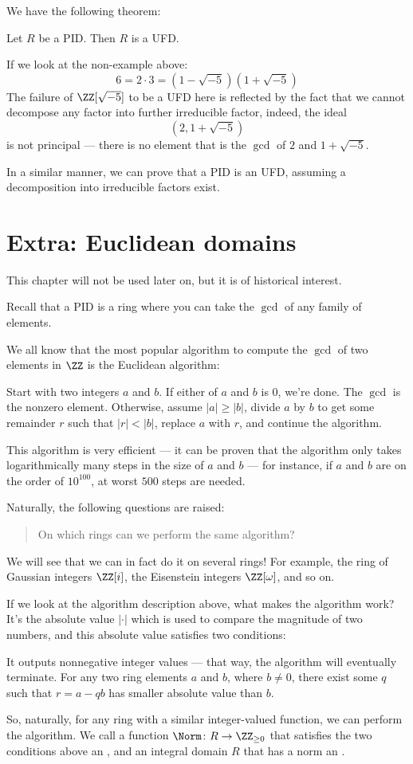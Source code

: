 We have the following theorem:
\begin{theorem}
	Let $R$ be a PID. Then $R$ is a UFD.
\end{theorem}

If we look at the non-example above:
\[ 6 = 2 \cdot 3 = \left( 1-\sqrt{-5} \right) \left( 1+\sqrt{-5} \right) \]
The failure of $\ZZ[\sqrt{-5}]$ to be a UFD here is reflected by the fact that we cannot decompose
any factor into further irreducible factor, indeed, the ideal
\[ \left( 2, 1 + \sqrt{-5} \right) \]
is not principal --- there is no element that is the $\gcd$ of $2$ and $1 + \sqrt{-5}$.

In a similar manner, we can prove that a PID is an UFD, assuming a decomposition into irreducible
factors exist.

\section{Extra: Euclidean domains}

This chapter will not be used later on, but it is of historical interest.

Recall that a PID is a ring where you can take the $\gcd$ of any family of elements.

We all know that the most popular algorithm to compute the $\gcd$ of two elements in $\ZZ$ is the
Euclidean algorithm:
\begin{itemize}
	\ii Start with two integers $a$ and $b$.
	\ii If either of $a$ and $b$ is $0$, we're done. The $\gcd$ is the nonzero element.
	\ii Otherwise, assume $|a| \geq |b|$, divide $a$ by $b$ to get some remainder $r$ such that
	$|r| < |b|$, replace $a$ with $r$, and continue the algorithm.
\end{itemize}
This algorithm is very efficient --- it can be proven that the algorithm only takes logarithmically
many steps in the size of $a$ and $b$ --- for instance, if $a$ and $b$ are on the order of
$10^{100}$, at worst $500$ steps are needed.

Naturally, the following questions are raised:
\begin{quote}
	On which rings can we perform the same algorithm?
\end{quote}
We will see that we can in fact do it on several rings! For example, the ring of Gaussian integers
$\ZZ[i]$, the Eisenstein integers $\ZZ[\omega]$, and so on.

If we look at the algorithm description above, what makes the algorithm work?
It's the absolute value $|\cdot|$ which is used to compare the magnitude of two numbers,
and this absolute value satisfies two conditions:
\begin{itemize}
	\ii It outputs nonnegative integer values --- that way, the algorithm will eventually terminate.
	\ii For any two ring elements $a$ and $b$, where $b \neq 0$, there exist some $q$ such that
	$r = a-qb$ has smaller absolute value than $b$.
\end{itemize}
So, naturally, for any ring with a similar integer-valued function, we can perform the algorithm.
We call a function $\Norm \colon R \to \ZZ_{\geq 0}$ that satisfies the two conditions above an
, and an integral domain $R$ that has a norm an .

